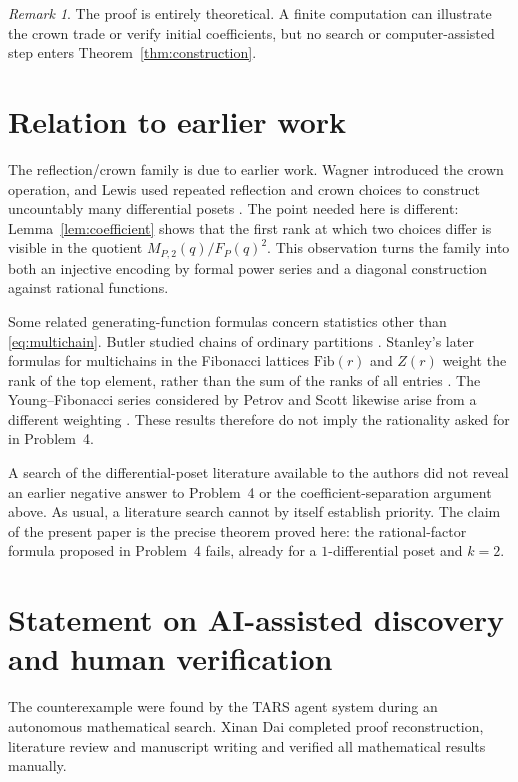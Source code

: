 \documentclass[11pt]{amsart}
\theoremstyle{remark}
\newtheorem{remark}[theorem]{Remark}
\begin{document}
\begin{remark}
The proof is entirely theoretical. A finite computation can illustrate the crown trade or verify initial coefficients, but no search or computer-assisted step enters Theorem~\ref{thm:construction}.
\end{remark}

\section{Relation to earlier work}

The reflection/crown family is due to earlier work. Wagner introduced the crown operation, and Lewis used repeated reflection and crown choices to construct uncountably many differential posets \cite{Lew07}. The point needed here is different: Lemma~\ref{lem:coefficient} shows that the first rank at which two choices differ is visible in the quotient $M_{P,2}(q)/F_P(q)^2$. This observation turns the family into both an injective encoding by formal power series and a diagonal construction against rational functions.

Some related generating-function formulas concern statistics other than \eqref{eq:multichain}. Butler studied chains of ordinary partitions \cite{But89}. Stanley's later formulas for multichains in the Fibonacci lattices $\mathrm{Fib}(r)$ and $Z(r)$ weight the rank of the top element, rather than the sum of the ranks of all entries \cite{Sta90}. The Young--Fibonacci series considered by Petrov and Scott likewise arise from a different weighting \cite{PS26}. These results therefore do not imply the rationality asked for in Problem~4.

A search of the differential-poset literature available to the authors did not reveal an earlier negative answer to Problem~4 or the coefficient-separation argument above. As usual, a literature search cannot by itself establish priority. The claim of the present paper is the precise theorem proved here: the rational-factor formula proposed in Problem~4 fails, already for a $1$-differential poset and $k=2$.

\section*{Statement on AI-assisted discovery and human verification}

The counterexample were found by the TARS agent system during an autonomous mathematical search. Xinan Dai completed proof reconstruction, literature review and manuscript writing and verified all mathematical results manually.
\end{document}
